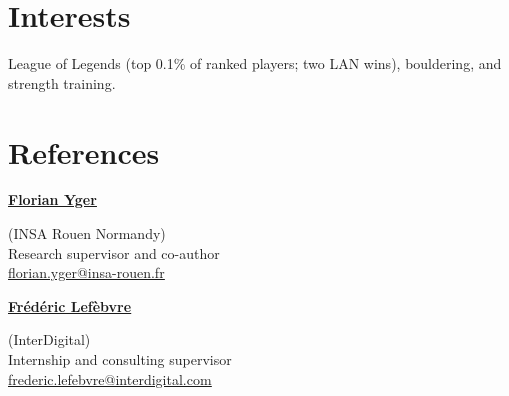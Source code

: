 \documentclass[11pt,a4paper]{article}
\let\plainhref\href
\renewcommand{\href}[2]{%
  \plainhref{#1}{\uline{#2}}%
}
\begin{document}
\section*{Interests}
League of Legends (top 0.1\% of ranked players; two LAN wins), bouldering, and strength training.

\section*{References}
\begin{minipage}[t]{0.49\linewidth}
  \setlength{\parskip}{0pt}
  \href{https://scholar.google.com/citations?user=NF_1_38AAAAJ}{\textbf{Florian Yger}}
    {\small\color{muted}(INSA Rouen Normandy)}\\
  {\small\color{muted}Research supervisor and co-author}\\
  {\small\href{mailto:florian.yger@insa-rouen.fr}{florian.yger@insa-rouen.fr}}
\end{minipage}\hfill
\begin{minipage}[t]{0.49\linewidth}
  \setlength{\parskip}{0pt}
  \href{https://www.linkedin.com/in/frederic-lefebvre-a8590b11/}{\textbf{Fr\'ed\'eric Lef\`ebvre}}
    {\small\color{muted}(InterDigital)}\\
  {\small\color{muted}Internship and consulting supervisor}\\
  {\small\href{mailto:frederic.lefebvre@interdigital.com}{frederic.lefebvre@interdigital.com}}
\end{minipage}
\end{document}
